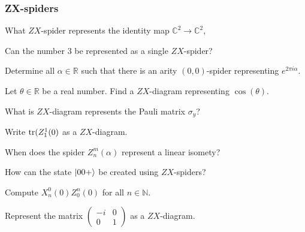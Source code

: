 \documentclass[a4paper, oneside, 12pt]{amsart}
\begin{document}
\subsubsection*{ZX-spiders}
\begin{thmlist}
  \item What \(ZX\)-spider represents the identity map \( \mathbb{C}^{2} \to \mathbb{C}^{2}\),
  \item Can the number \(3\) be represented as a single \(ZX\)-spider?
  \item Determine all  \(\alpha \in \mathbb{ \mathbb{R}}\) such that there is an arity \((0,0)\)-spider representing \(e^{2\pi i \alpha}\).
  \item Let \(\theta \in \mathbb{R}\) be a real number.
  Find a \(ZX\)-diagram representing \(\cos(\theta)\).
  \item What is \(ZX\)-diagram represents the Pauli matrix \(\sigma_{y}\)?
  \item Write \(\operatorname{tr}(Z_{1}^{1}(0)\) as a \(ZX\)-diagram.
  \item When does the spider \(Z_{n}^{m}(\alpha)\) represent a linear isomety?
  \item How can the state \(\lvert00+\rangle\) be created using \(ZX\)-spiders?
  \item Compute \(X_{n}^{0}(0)Z_{0}^{n}(0)\) for all \(n \in \mathbb{N}\).
  \item Represent the matrix \(
  \begin{pmatrix}
    -i & 0 \\ 0 & 1
  \end{pmatrix}
  \) as a \(ZX\)-diagram.
\end{thmlist}
\end{document}
